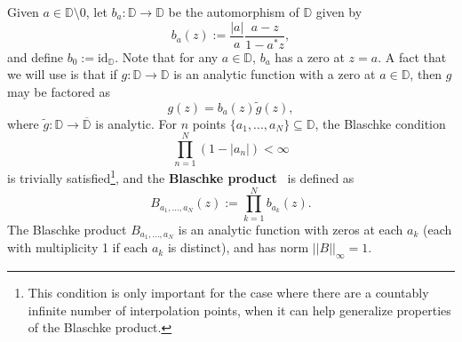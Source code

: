 Given $a\in\mathbb D\setminus 0$, let $b_a : \mathbb D\rightarrow\mathbb D$ be the automorphism of $\mathbb D$ given by
\begin{equation}
    b_a(z) := \frac{|a|}{a} \frac{a - z}{1 - a^* z},
\end{equation}
and define $b_0 := \mathrm{id}_{\mathbb D}$. Note that for any $a\in\mathbb D$, $b_a$ has a zero at $z = a$. A fact that we will use is that if $g : \mathbb D\rightarrow\mathbb D$ is an analytic function with a zero at $a\in\mathbb D$, then $g$ may be factored as
\begin{equation}
    g(z) = b_a(z) \tilde{g}(z),
    \label{eq:fact1_blaschke}
\end{equation}
where $\tilde g : \mathbb D\rightarrow\overline{\mathbb D}$ is analytic. For $n$ points $\{a_1, ..., a_N\}\subseteq\mathbb D$, the Blaschke condition
\begin{equation}
    \prod_{n = 1}^N (1 - |a_n|) < \infty
\end{equation} is trivially satisfied\footnote{This condition is only important for the case where there are a countably infinite number of interpolation points, when it can help generalize properties of the Blaschke product.}, and the \textbf{Blaschke product}~\cite{https://doi.org/10.48550/arxiv.1512.05444} is defined as
\begin{equation}
    B_{a_1, ..., a_N}(z) := \prod_{k = 1}^N b_{a_k}(z).
\end{equation}
The Blaschke product $B_{a_1, ..., a_N}$ is an analytic function with zeros at each $a_k$ (each with multiplicity 1 if each $a_k$ is distinct), and has norm $||B||_\infty = 1$. 

